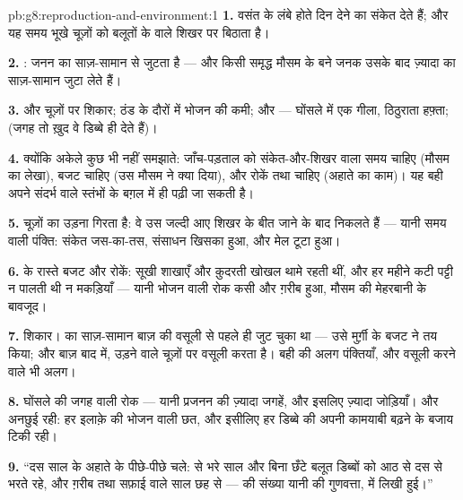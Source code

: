 \begin{solution}{pb:g8:reproduction-and-environment:1}
\textbf{1.} वसंत के लंबे होते दिन  देने का संकेत देते हैं; और यह
समय भूखे चूज़ों को बलूतों के  वाले शिखर पर बिठाता है।

\textbf{2.} : जनन का
साज़-सामान  से जुटता है --- और किसी समृद्ध मौसम के बने जनक उसके बाद
ज़्यादा  का साज़-सामान जुटा लेते हैं।

\textbf{3.}  और चूज़ों पर शिकार; ठंड के दौरों में भोजन की कमी; और
 --- घोंसले में एक गीला, ठिठुराता हफ़्ता; (जगह तो ख़ुद वे
डिब्बे ही देते हैं)।

\textbf{4.} क्योंकि अकेले  कुछ भी नहीं समझाते: जाँच-पड़ताल को
संकेत-और-शिखर वाला समय चाहिए (मौसम का लेखा), बजट चाहिए (उस मौसम ने क्या
दिया), और रोकें तथा  चाहिए (अहाते का काम)। यह बही अपने संदर्भ वाले
स्तंभों के बग़ल में ही पढ़ी जा सकती है।

\textbf{5.} चूज़ों का उड़ना गिरता है: वे उस जल्दी आए शिखर के बीत जाने के
बाद निकलते हैं --- यानी समय वाली पंक्ति: संकेत जस-का-तस, संसाधन खिसका
हुआ, और मेल टूटा हुआ।

\textbf{6.}  के रास्ते बजट और रोकें: सूखी शाखाएँ  और क़ुदरती
खोखल थामे रहती थीं, और हर महीने कटी पट्टी न  पालती थी न
मकड़ियाँ --- यानी भोजन वाली रोक कसी और  ग़रीब हुआ, मौसम की मेहरबानी
के बावजूद।

\textbf{7.} शिकार।  का साज़-सामान बाज़ की वसूली से पहले ही जुट
चुका था --- उसे मुर्ग़ी के बजट ने तय किया; और बाज़ बाद में, उड़ने वाले
चूज़ों पर वसूली करता है। बही की अलग पंक्तियाँ, और वसूली करने वाले भी
अलग।

\textbf{8.} घोंसले की जगह वाली रोक --- यानी प्रजनन की ज़्यादा जगहें, और
इसलिए ज़्यादा जोड़ियाँ। और अनछुई रही: हर इलाक़े की भोजन वाली छत, और
इसीलिए हर डिब्बे की अपनी कामयाबी बढ़ने के बजाय टिकी रही।

\textbf{9.} ``दस साल के  अहाते के पीछे-पीछे चले:  से भरे
साल और बिना छँटे बलूत डिब्बों को आठ से दस  से भरते रहे, और ग़रीब
तथा सफ़ाई वाले साल छह से ---  की संख्या यानी  की गुणवत्ता,
 में लिखी हुई।''


\end{solution}
